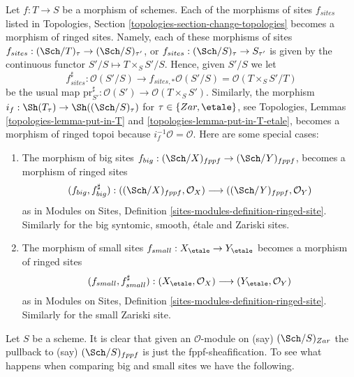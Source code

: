 \begin{remark}
\label{remark-change-topologies-ringed}
Let $f : T \to S$ be a morphism of schemes.
Each of the morphisms of sites $f_{sites}$ listed in
Topologies, Section \ref{topologies-section-change-topologies}
becomes a morphism of ringed sites. Namely, each of these morphisms of sites
$f_{sites} : (\Sch/T)_\tau \to (\Sch/S)_{\tau'}$, or
$f_{sites} : (\Sch/S)_\tau \to S_{\tau'}$ is given by the continuous
functor $S'/S \mapsto T \times_S S'/S$. Hence, given $S'/S$ we let
$$
f_{sites}^\sharp :
\mathcal{O}(S'/S)
\longrightarrow
f_{sites, *}\mathcal{O}(S'/S) =
\mathcal{O}(T \times_S S'/T)
$$
be the usual map
$\text{pr}_{S'}^\sharp : \mathcal{O}(S') \to \mathcal{O}(T \times_S S')$.
Similarly, the morphism
$i_f : \Sh(T_\tau) \to \Sh((\Sch/S)_\tau)$
for $\tau \in \{Zar, \etale\}$, see
Topologies, Lemmas \ref{topologies-lemma-put-in-T} and
\ref{topologies-lemma-put-in-T-etale},
becomes a morphism of ringed topoi because $i_f^{-1}\mathcal{O} = \mathcal{O}$.
Here are some special cases:
\begin{enumerate}
\item The morphism of big sites
$f_{big} : (\Sch/X)_{fppf} \to (\Sch/Y)_{fppf}$,
becomes a morphism of ringed sites
$$
(f_{big}, f_{big}^\sharp) :
((\Sch/X)_{fppf}, \mathcal{O}_X)
\longrightarrow
((\Sch/Y)_{fppf}, \mathcal{O}_Y)
$$
as in Modules on Sites, Definition \ref{sites-modules-definition-ringed-site}.
Similarly for the big syntomic, smooth, \'etale and Zariski sites.
\item The morphism of small sites
$f_{small} : X_\etale \to Y_\etale$
becomes a morphism of ringed sites
$$
(f_{small}, f_{small}^\sharp) :
(X_\etale, \mathcal{O}_X)
\longrightarrow
(Y_\etale, \mathcal{O}_Y)
$$
as in Modules on Sites, Definition \ref{sites-modules-definition-ringed-site}.
Similarly for the small Zariski site.
\end{enumerate}
\end{remark}

\noindent
Let $S$ be a scheme. It is clear that given an $\mathcal{O}$-module on (say)
$(\Sch/S)_{Zar}$ the pullback to (say) $(\Sch/S)_{fppf}$
is just the fppf-sheafification. To see what happens when comparing
big and small sites we have the following.

